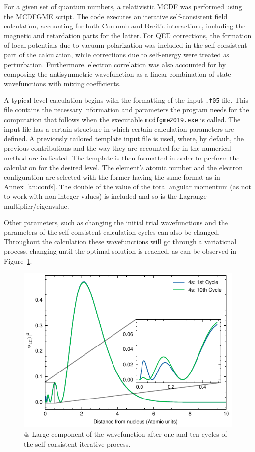 For a given set of quantum numbers, a relativistic \gls{MCDF} was performed using the \gls{MCDFGME} script. The code executes an iterative self-consistent field calculation, accounting for both Coulomb and Breit's interactions, including the magnetic and retardation parts for the latter. For \gls{QED} corrections, the formation of local potentials due to vacuum polarization was included in the self-consistent part of the calculation, while corrections due to self-energy were treated as perturbation. Furthermore, electron correlation was also accounted for by composing the antisymmetric wavefunction as a linear combination of state wavefunctions with mixing coefficients.

A typical level calculation begins with the formatting of the input \verb|.f05| file. This file contains the necessary information and parameters the program needs for the computation that follows when the executable \verb|mcdfgme2019.exe| is called. The input file has a certain structure in which certain calculation parameters are defined. A previously tailored template input file is used, where, by default, the previous contributions and the way they are accounted for in the numerical method are indicated. The template is then formatted in order to perform the calculation for the desired level. The element's atomic number and the electron configuration are selected with the former having the same format as in Annex~\ref{an:confs}. The double of the value of the  total angular momentum (as not to work with non-integer values) is included  and so is the Lagrange multiplier/eigenvalue.

 Other parameters, such as changing the initial trial wavefunctions and the parameters of the self-consistent calculation cycles can also be changed. Throughout the calculation these wavefunctions will go through a variational process, changing until the optimal solution is reached, as can be observed in Figure~\ref{fig:WFcomp}.

\begin{figure}[h!]
    \centering
    \includegraphics[width=.5\textwidth]{Chapters/Figures/Chapter2/WFcomp.pdf}
    \caption{ 4s Large component of the wavefunction after one and ten cycles of the self-consistent iterative process.}\label{fig:WFcomp}
\end{figure}

